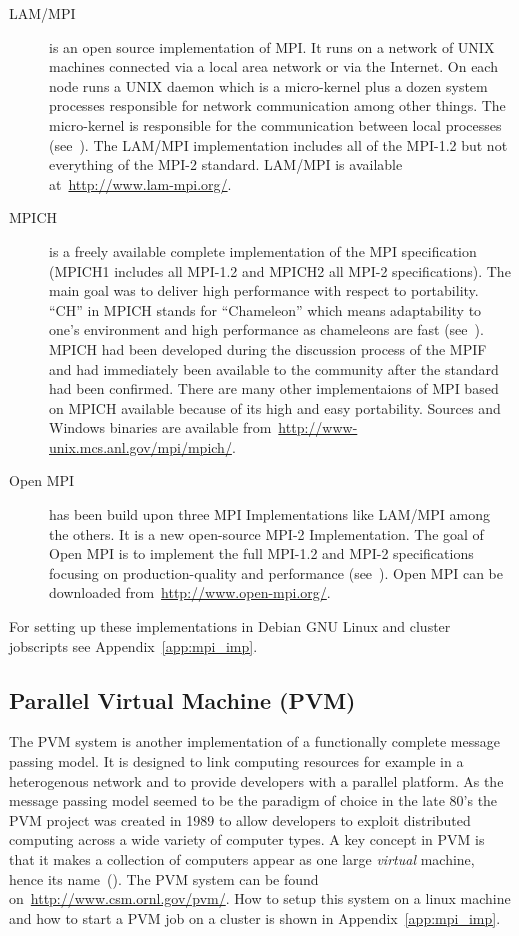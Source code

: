 \begin{description}
\item[LAM/MPI] is an open source implementation of MPI. It runs on a
  network of UNIX machines connected via a local area network or via
  the Internet. On each node runs a UNIX daemon which is a
  micro-kernel plus a dozen system processes responsible for network
  communication among other things. The micro-kernel is
  responsible for the communication between local processes
  (see~\cite{burns94lam}). The LAM/MPI implementation includes all of
  the MPI-1.2 but not everything of the MPI-2 standard. LAM/MPI is
  available at~\url{http://www.lam-mpi.org/}.
\item[MPICH] is a freely available complete implementation of the MPI
  specification (MPICH1 includes all MPI-1.2 and MPICH2 all MPI-2
  specifications). The main goal was to deliver high performance with
  respect to portability. ``CH'' in MPICH stands for ``Chameleon''
  which means adaptability to one's environment and high performance
  as chameleons are fast (see~\cite{gropp96mpich}). MPICH had been
  developed during the discussion process of the MPIF and had immediately been
  available to the community after the standard had been
  confirmed. There are many other implementaions of MPI based on MPICH
  available because of its high and easy portability. Sources and
  Windows binaries are available
  from~\url{http://www-unix.mcs.anl.gov/mpi/mpich/}.
\item[Open MPI] has been build upon three MPI Implementations like
  LAM/MPI among the others. It is a new open-source MPI-2
  Implementation. The goal of Open MPI is to implement the full
  MPI-1.2 and MPI-2 specifications focusing on production-quality and
  performance (see~\cite{gabriel04:_open_mpi}). Open MPI can be
  downloaded from~\url{http://www.open-mpi.org/}.
\end{description}

For setting up these implementations in Debian GNU Linux and cluster
jobscripts see Appendix~\ref{app:mpi_imp}. 

\subsection{Parallel Virtual Machine (PVM)}
\label{sec:PVM}

The PVM system is another implementation of a functionally
complete message passing model. It is designed to link computing
resources for example in a heterogenous network and to provide
developers with a parallel platform. As the message passing model
seemed to be the paradigm of choice in the late 80's the PVM project
was created in 1989 to allow developers to exploit distributed
computing across a wide variety of computer types. A key concept in
PVM is that it makes a collection of computers appear as one large
\textit{virtual} machine, hence its name~(\cite{geist94pvm}). The PVM
system can be found on~\url{http://www.csm.ornl.gov/pvm/}. How to
setup this system on a linux machine and how to start a PVM job on a
cluster is shown in Appendix~\ref{app:mpi_imp}.


